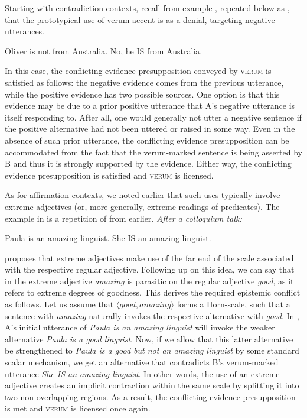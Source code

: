 \documentclass[output=paper,colorlinks,citecolor=brown]{langscibook}
\begin{document}
Starting with contradiction contexts, recall from example , repeated below as , that the prototypical use of verum accent is as a denial, targeting negative utterances. 
\is{}
\ea\label{Vrm.Contr.Eg2} 
    \begin{xlist}
	 Oliver is not from Australia. 
	 No, he IS from Australia.
	\end{xlist}
\z
\il{}
In this case, the conflicting evidence presupposition conveyed by \textsc{verum} is satisfied as follows: the negative evidence comes from the previous utterance, while the positive evidence has two possible sources. One option is that this evidence may be due to a prior positive utterance that A's negative utterance is itself responding to. After all, one would generally not utter a negative sentence if the positive alternative had not been uttered or raised in some way. Even in the absence of such prior utterance, the conflicting evidence presupposition can be accommodated from the fact that the verum-marked sentence is being asserted by B and thus it is strongly supported by the evidence. Either way, the conflicting evidence presupposition is satisfied and \textsc{verum} is licensed.    
	
As for affirmation contexts, we noted earlier that such uses typically involve extreme adjectives (or, more generally, extreme readings of predicates). The example in  is a repetition of  from earlier. 
\is{}
\ea \textit{After a colloquium talk:} \label{Vrm.Aff.Eg2}
    \begin{xlist}
	     Paula is an amazing linguist.           
	     She IS an amazing linguist.
    \end{xlist}
\z
\il{}
\citet{Morzycki2012} proposes that extreme adjectives make use of the far end of the scale associated with the respective regular adjective. Following up on this idea, we can say that in  the extreme adjective \textit{amazing} is parasitic on the regular adjective \textit{good}, as it refers to extreme degrees of goodness. This derives the required epistemic conflict as follows. Let us assume that $\langle good, amazing \rangle$ forms a Horn-scale, such that a sentence with \textit{amazing} naturally invokes the respective alternative with \textit{good}. In , A's initial utterance of \textit{Paula is an amazing linguist} will invoke the weaker alternative \textit{Paula is a good linguist}. Now, if we allow that this latter alternative be strengthened to \textit{Paula is a good but not an amazing linguist} by some standard scalar mechanism, we get an alternative that contradicts B's verum-marked utterance \textit{She IS an amazing linguist}. In other words, the use of an extreme adjective creates an implicit contraction within the same scale by splitting it into two non-overlapping regions. As a result, the conflicting evidence presupposition is met and \textsc{verum} is licensed once again.    
	
\end{document}

